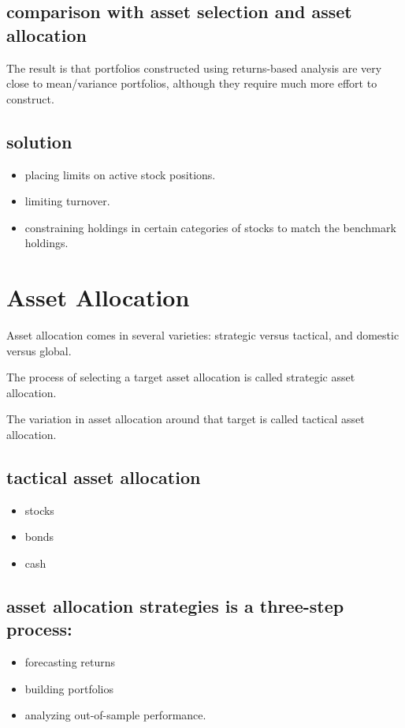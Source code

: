 \documentclass[presentation]{beamer}
\begin{document}
\subsection{comparison with asset selection and asset allocation}
\label{sec:orgheadline14}
The result is that portfolios constructed using returns-based analysis are very close to mean/variance portfolios, although they require much more effort to construct.
\subsection{solution}
\label{sec:orgheadline15}
\begin{itemize}
\item placing limits on active stock positions.
\item limiting turnover.
\item constraining holdings in certain categories of stocks to match the benchmark holdings.
\end{itemize}
\section{Asset Allocation}
\label{sec:orgheadline19}
Asset allocation comes in several varieties: strategic versus tactical, and domestic versus global.

The process of selecting a target asset allocation is called strategic asset allocation.

The variation in asset allocation around that target is called tactical asset allocation.
\subsection{tactical asset allocation}
\label{sec:orgheadline17}
\begin{itemize}
\item stocks
\item bonds
\item cash
\end{itemize}
\subsection{asset allocation strategies is a three-step process:}
\label{sec:orgheadline18}
\begin{itemize}
\item forecasting returns
\item building portfolios
\item analyzing out-of-sample performance.
\end{itemize}
\end{document}
